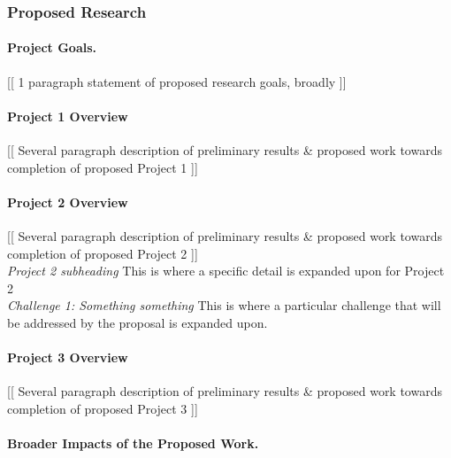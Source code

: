 \documentclass[12pt]{article}
\begin{document}
\subsubsection{Proposed Research}

\paragraph{Project Goals.}

[[ 1 paragraph statement of proposed research goals, broadly ]]\\

\paragraph{Project 1 Overview}

[[ Several paragraph description of preliminary results \& proposed work
towards completion of proposed Project 1 ]]\\

\paragraph{Project 2 Overview}

[[ Several paragraph description of preliminary results \& proposed work
towards completion of proposed Project 2 ]]\\

{\em Project 2 subheading} This is where a specific detail is expanded upon
for Project 2\\

{\em Challenge 1: Something something} This is where a particular challenge
that will be addressed by the proposal is expanded upon.

\paragraph{Project 3 Overview}

[[ Several paragraph description of preliminary results \& proposed work
towards completion of proposed Project 3 ]]\\

\vspace*{-4mm} \paragraph{Broader Impacts of the Proposed Work.}
\end{document}
